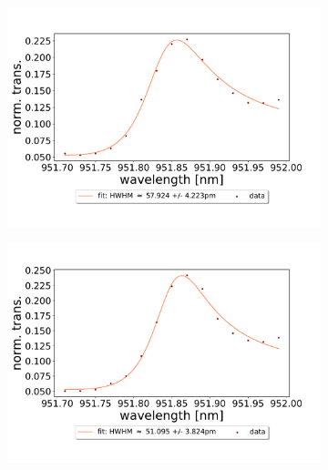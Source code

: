 \begin{figure}[h!]
    \centering
    \begin{subfigure}[b]{0.49\textwidth}
        \includegraphics[width=\textwidth]{figures/results/double fano fits/320um_M3:M5_fit_1.pdf}
        \caption{}
        \label{fig:320um_M3:M5_fit_1}
    \end{subfigure}
    \begin{subfigure}[b]{0.49\textwidth}
        \includegraphics[width=\textwidth]{figures/results/double fano fits/320um_M3:M5_fit_2.pdf}
        \caption{}
        \label{fig:320um_M3:M5_fit_2}
    \end{subfigure}
    \begin{subfigure}[b]{0.49\textwidth}

\end{subfigure}
\end{figure}
